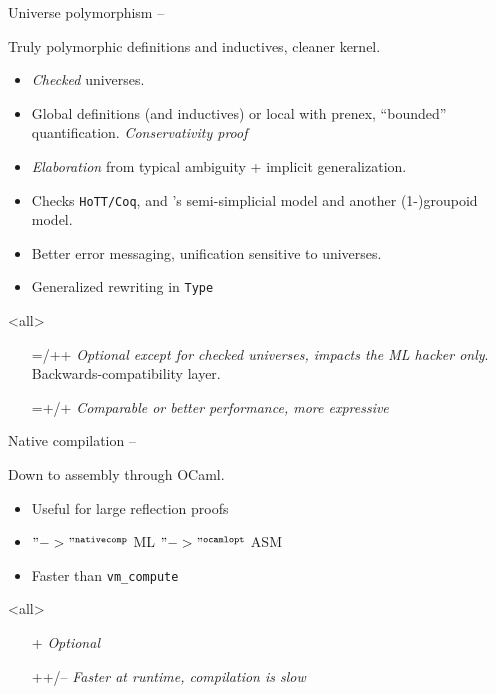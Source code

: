 
\begin{subsecframe}{Universe polymorphism -- }
  \begin{center}
    Truly polymorphic definitions and inductives, cleaner kernel. 
  \end{center}
  
  \begin{itemize}
  \item \emph{Checked} universes.
  \item Global definitions (and inductives) or local with prenex, ``bounded''
    quantification. \emph{Conservativity proof}
  \item \emph{Elaboration} from typical ambiguity + implicit
    generalization.
  \item Checks \texttt{HoTT/Coq},  and 's semi-simplicial
    model and another (1-)groupoid model.
  \item Better error messaging, unification sensitive to universes.
  \item Generalized rewriting in \alert{\texttt{Type}}
  \end{itemize}
  \mode<all>

  \begin{itemize}
  \item[=/++] \emph{Optional except for checked
      universes, impacts the ML hacker only}. Backwards-compatibility layer.
  \item[=+/+] \emph{Comparable or better performance, more expressive}
  \end{itemize}
\end{subsecframe}


\begin{subsecframe}{Native compilation -- }
  \begin{center}
    Down to assembly through OCaml.
  \end{center}

  \begin{itemize}
  \item Useful for large reflection proofs
  \item \Coq $"->"^{\texttt{nativecomp}}$ \textsc{ML} $"->"^{\texttt{ocamlopt}}$ \textsc{ASM}
  \item Faster than \texttt{vm\_compute}
  \end{itemize}
  \mode<all>

  \begin{itemize}
  \item[+] \emph{Optional}
  \item[++/--] \emph{Faster at runtime, compilation is slow}
  \end{itemize}
\end{subsecframe}

